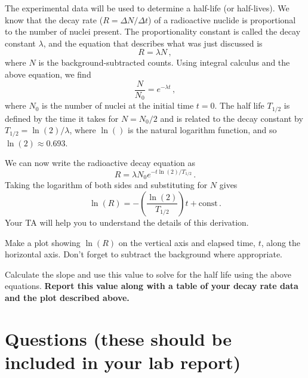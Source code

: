The experimental data will be used to determine a half-life (or half-lives). We know that
the decay rate ($R=\Delta N / \Delta t$) of a radioactive nuclide is proportional to the number of nuclei present. The proportionality constant is called the decay constant $\lambda$, and the equation that describes what was just discussed is
\begin{equation}
 R = \lambda N \,,
\end{equation}
where $N$ is the background-subtracted counts. Using integral calculus and the above equation, we find
\begin{equation}
 \frac{N}{N_0} = e^{-\lambda t} \,,
\end{equation}
where $N_0$ is the number of nuclei at the initial time $t=0$. The half life $T_{1/2}$ is defined by
the time it takes for $N = N_0 /2$ and is related to the decay constant by $T_{1/2} = \ln(2)/ \lambda$, where
$\ln()$ is the natural logarithm function, and so $\ln(2) \approx 0.693$.

We can now write the radioactive decay equation as
\begin{equation}
 R = \lambda N_0 e^{-t \ln(2) / T_{1/2}} \,.
\end{equation}
Taking the logarithm of both sides and substituting for $N$ gives
\begin{equation}
 \ln(R) = - \left(\frac{\ln(2)}{T_{1/2}} \right) t + \mathrm{const} \,.
\end{equation}
Your TA will help you to understand the details of this derivation.

\begin{steps}
	\item Make a plot showing $\ln(R)$ on the vertical axis and elapsed time, $t$, along the horizontal axis. Don’t forget to subtract the background where appropriate.

	\item Calculate the slope and use this value to solve for the half life using the above equations. \textbf{Report this value along with a table of your decay rate data and the plot described above.}
\end{steps}

\section{Questions (these should be included in your lab report)}

